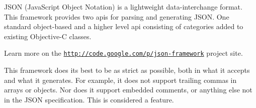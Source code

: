 JSON (JavaScript Object Notation) is a lightweight data-\/interchange format. This framework provides two apis for parsing and generating JSON. One standard object-\/based and a higher level api consisting of categories added to existing Objective-\/C classes.

Learn more on the \href{http://code.google.com/p/json-framework}{\tt http://code.google.com/p/json-\/framework} project site.

This framework does its best to be as strict as possible, both in what it accepts and what it generates. For example, it does not support trailing commas in arrays or objects. Nor does it support embedded comments, or anything else not in the JSON specification. This is considered a feature. 